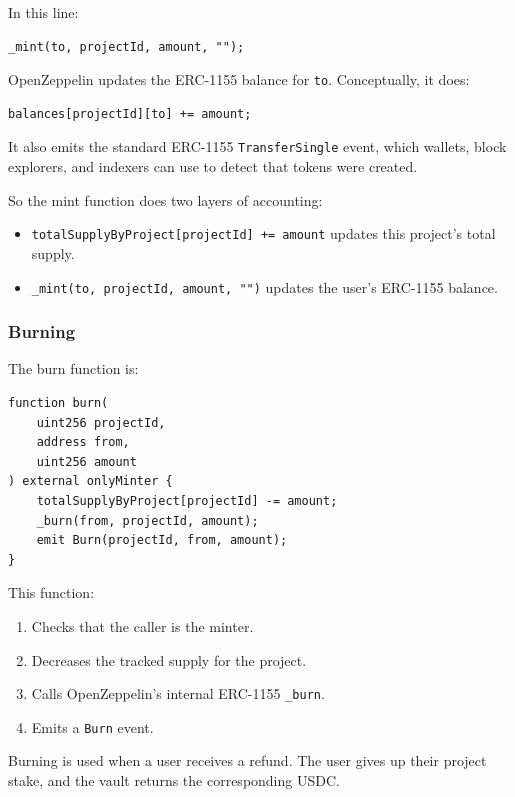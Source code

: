 \documentclass[11pt,a4paper]{article}
\begin{document}
In this line:

\begin{lstlisting}
_mint(to, projectId, amount, "");
\end{lstlisting}

OpenZeppelin updates the ERC-1155 balance for \texttt{to}. Conceptually, it does:

\begin{lstlisting}
balances[projectId][to] += amount;
\end{lstlisting}

It also emits the standard ERC-1155 \texttt{TransferSingle} event, which wallets, block explorers, and indexers can use to detect that tokens were created.

So the mint function does two layers of accounting:

\begin{itemize}
  \item \texttt{totalSupplyByProject[projectId] += amount} updates this project's total supply.
  \item \texttt{\_mint(to, projectId, amount, "")} updates the user's ERC-1155 balance.
\end{itemize}

\subsubsection{Burning}

The burn function is:

\begin{lstlisting}
function burn(
    uint256 projectId,
    address from,
    uint256 amount
) external onlyMinter {
    totalSupplyByProject[projectId] -= amount;
    _burn(from, projectId, amount);
    emit Burn(projectId, from, amount);
}
\end{lstlisting}

This function:

\begin{enumerate}
  \item Checks that the caller is the minter.
  \item Decreases the tracked supply for the project.
  \item Calls OpenZeppelin's internal ERC-1155 \texttt{\_burn}.
  \item Emits a \texttt{Burn} event.
\end{enumerate}

Burning is used when a user receives a refund. The user gives up their project stake, and the vault returns the corresponding USDC.
\end{document}
